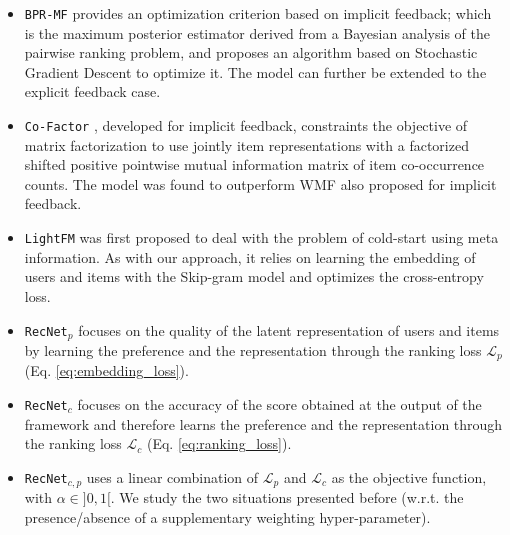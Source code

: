 \documentclass[10pt,journal,compsoc]{IEEEtran}
\newcommand{\RecNet}{\texttt{RecNet}}
\newcommand{\MostPop}{\texttt{MostPop}}
\newcommand{\BPR}{\texttt{BPR-MF}}
\newcommand{\CoFactor}{\texttt{Co-Factor}}
\newcommand{\LightFM}{\texttt{LightFM}}
\newcommand{\Loss}{\mathcal{L}}
\begin{document}
\begin{sloppypar}
\begin{itemize}
\item {\BPR} \cite{rendle_09} provides an optimization criterion based on implicit feedback; which is the maximum posterior estimator derived from a Bayesian analysis of the pairwise ranking problem, and proposes an algorithm based on Stochastic Gradient Descent to optimize it. The model can further be extended to the explicit feedback case.
\item {\CoFactor} \cite{liang_16}, developed for implicit feedback, constraints the objective of matrix factorization to use jointly item representations with a factorized shifted positive pointwise mutual information matrix of item
co-occurrence counts. The model was found to outperform WMF \cite{Hu:2008} also proposed for implicit feedback.
\item {\LightFM} \cite{kula_15} was first proposed to deal with the problem of cold-start using meta information. As with our approach, it relies on learning the embedding of users and items with the Skip-gram model and optimizes the cross-entropy loss.
\item {\RecNet}$_p$ focuses on the quality of the latent representation of users and items by learning the preference and the representation through the ranking loss $\Loss_p$ (Eq. \ref{eq:embedding_loss}).
\item {\RecNet}$_c$ focuses on the accuracy of the score obtained at the output of the framework and therefore learns the preference and the representation through the ranking loss $\Loss_c$ (Eq. \ref{eq:ranking_loss}).
\item {\RecNet}$_{c,p}$ uses a linear combination of $\Loss_p$ and $\Loss_c$ as the objective function, with $\alpha\in ]0,1[$. We study the two situations presented before (w.r.t. the presence/absence of a supplementary weighting hyper-parameter).
\end{itemize}



\end{sloppypar}
\end{document}
